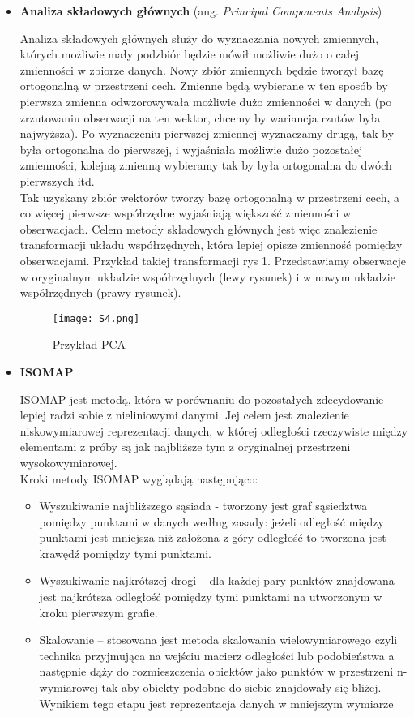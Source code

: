 \begin{itemize}
	\item \textbf{Analiza składowych głównych} (ang. \textit{Principal Components Analysis})
	
	Analiza składowych głównych służy do wyznaczania nowych zmiennych, których możliwie mały podzbiór będzie mówił możliwie dużo o całej zmienności w zbiorze danych. Nowy zbiór zmiennych będzie tworzył bazę ortogonalną w przestrzeni cech. Zmienne będą wybierane w ten sposób by pierwsza zmienna odwzorowywała możliwie dużo zmienności w danych (po zrzutowaniu obserwacji na ten wektor, chcemy by wariancja rzutów była najwyższa). Po wyznaczeniu pierwszej zmiennej wyznaczamy drugą, tak by była ortogonalna do pierwszej, i wyjaśniała możliwie dużo pozostałej zmienności, kolejną zmienną wybieramy tak by była ortogonalna do dwóch pierwszych itd. \\
	
	Tak uzyskany zbiór wektorów tworzy bazę ortogonalną w przestrzeni cech, a co więcej pierwsze współrzędne wyjaśniają większość zmienności w obserwacjach. Celem metody składowych głównych jest więc znalezienie transformacji układu współrzędnych, która lepiej opisze zmienność pomiędzy obserwacjami. Przykład takiej transformacji rys 1. Przedstawiamy obserwacje w oryginalnym układzie współrzędnych (lewy rysunek) i w nowym układzie współrzędnych (prawy rysunek).
	
	\begin{figure}[H]
		\centering
		\texttt{[image: S4.png]}
		\caption{Przykład PCA}
	\end{figure}

	\item \textbf{ISOMAP}
	
	ISOMAP jest metodą, która w porównaniu do pozostałych zdecydowanie lepiej radzi sobie z nieliniowymi danymi. Jej celem jest znalezienie niskowymiarowej reprezentacji danych, w której odległości rzeczywiste między elementami z próby są jak najbliższe tym z oryginalnej przestrzeni wysokowymiarowej. \\
	
	Kroki metody ISOMAP wyglądają następująco:
	\begin{itemize}
		\item Wyszukiwanie najbliższego sąsiada - tworzony jest graf sąsiedztwa pomiędzy punktami w danych według zasady: jeżeli odległość między punktami jest mniejsza niż założona z góry odległość to tworzona jest krawędź pomiędzy tymi punktami.
		\item Wyszukiwanie najkrótszej drogi – dla każdej pary punktów znajdowana jest najkrótsza odległość pomiędzy tymi punktami na utworzonym w kroku pierwszym grafie.
		\item Skalowanie – stosowana jest metoda skalowania wielowymiarowego czyli technika przyjmująca na wejściu macierz odległości lub podobieństwa a następnie dąży do rozmieszczenia obiektów jako punktów w przestrzeni n-wymiarowej tak aby obiekty podobne do siebie znajdowały się bliżej.  Wynikiem tego etapu jest reprezentacja danych w mniejszym wymiarze
	\end{itemize}


\end{itemize}

